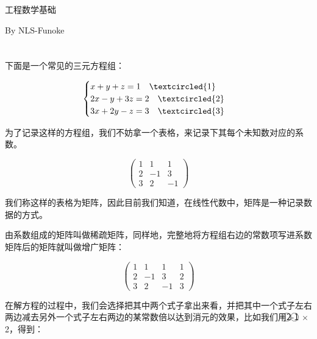\documentclass[12pt,a4paper]{book}
\begin{document}
\tableofcontents

\newpage

\begin{center}
{\zhhei\fontsize{30pt}{40pt} 工程数学基础}
\end{center}

\vspace{20pt}

\begin{center}
{\zhhei\centering By NLS-Funoke}
\end{center}

{\section{\centering\fontsize{25pt}{20pt}}}
{\subsection{\centering\fontsize{20pt}{20pt}}}

下面是一个常见的三元方程组：


\[
\begin{cases}
x + y + z = 1    \quad\textcircled{1}\\
2x - y + 3z = 2  \quad\textcircled{2}\\
3x + 2y - z = 3  \quad\textcircled{3}
\end{cases}
\]

为了记录这样的方程组，我们不妨拿一个表格，来记录下其每个未知数对应的系数。

\[
\begin{pmatrix}
1 & 1 & 1 \\
2 & -1 & 3 \\
3 & 2 & -1 
\end{pmatrix}
\]

我们称这样的表格为矩阵，因此目前我们知道，在线性代数中，矩阵是一种记录数据的方式。

由系数组成的矩阵叫做稀疏矩阵，同样地，完整地将方程组右边的常数项写进系数矩阵后的矩阵就叫做增广矩阵：

\[
\begin{pmatrix}
1 & 1 & 1 & 1\\
2 & -1 & 3 & 2\\
3 & 2 & -1 & 3
\end{pmatrix}
\]

在解方程的过程中，我们会选择把其中两个式子拿出来看，并把其中一个式子左右两边减去另外一个式子左右两边的某常数倍以达到消元的效果，比如我们用\textcircled{2}-\textcircled{1} $\times$ 2，得到：
\end{document}
